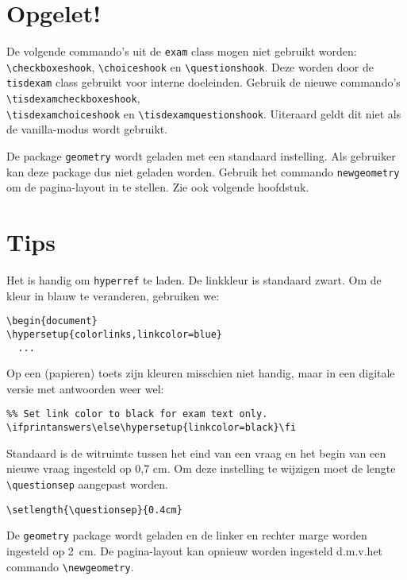 \documentclass[12pt,dutch,addpoints,fleqn]{tisdexam}
\newcommand\DocClass[1]{\texttt{#1}}
\begin{document}
\section{Opgelet!}
De volgende commando's uit de \DocClass{exam} class mogen niet gebruikt
worden: \verb|\checkboxeshook|, \verb|\choiceshook| en \verb|\questionshook|.
Deze worden door de \DocClass{tisdexam} class gebruikt voor interne doeleinden.
Gebruik de nieuwe commando's \verb|\tisdexamcheckboxeshook|, \\
\verb|\tisdexamchoiceshook| en \verb|\tisdexamquestionshook|. Uiteraard geldt
dit niet als de vanilla-modus wordt gebruikt.

De package \verb|geometry| wordt geladen met een standaard instelling. Als
gebruiker kan deze package dus niet geladen worden. Gebruik het commando
\verb|newgeometry| om de pagina-layout in te stellen. Zie ook volgende
hoofdstuk.


\section{Tips}
Het is handig om \verb|hyperref| te laden. De linkkleur is standaard zwart.
Om de kleur in blauw te veranderen, gebruiken we:

\begin{lstlisting}
\begin{document}
\hypersetup{colorlinks,linkcolor=blue}
  ...
\end{lstlisting}

Op een (papieren) toets zijn kleuren misschien niet handig, maar in een
digitale versie met antwoorden weer wel:

\begin{lstlisting}
%% Set link color to black for exam text only.
\ifprintanswers\else\hypersetup{linkcolor=black}\fi
\end{lstlisting}


Standaard is de witruimte tussen het eind van een vraag en het begin van een
nieuwe vraag ingesteld op 0,7 cm. Om deze instelling te wijzigen moet de
lengte \verb|\questionsep| aangepast worden.

\begin{lstlisting}
\setlength{\questionsep}{0.4cm}
\end{lstlisting}


De \verb|geometry| package wordt geladen en de linker en rechter marge worden
ingesteld op 2~cm. De pagina-layout kan opnieuw worden ingesteld
d.m.v.\@ het commando \verb|\newgeometry|.
\end{document}
